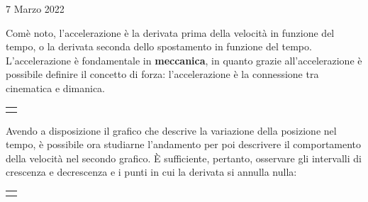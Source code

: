 \documentclass[a4paper]{extarticle}
\begin{document}
\newpage
\noindent
\begin{center}
  7 Marzo 2022
\end{center}
Comè noto, l'accelerazione è la derivata prima della velocità in funzione del tempo, o la derivata seconda dello spostamento in funzione del tempo.\\
L'accelerazione è fondamentale in \textbf{meccanica}, in quanto grazie all'accelerazione è possibile definire il concetto di forza: l'accelerazione è la connessione tra cinematica e dimanica.

\vspace{2em}
\noindent
{}
\begin{tabularx}{\textwidth}{P}
  {
      \centering
  }
\end{tabularx}

\vspace{1em}
\noindent
Avendo a disposizione il grafico che descrive la variazione della posizione nel tempo, è possibile ora studiarne l'andamento per poi descrivere il comportamento della velocità nel secondo grafico. È sufficiente, pertanto, osservare gli intervalli di crescenza e decrescenza e i punti in cui la derivata si annulla nulla:

\vspace{2em}
\noindent
{}
\begin{tabularx}{\textwidth}{P}
  {
      \centering
  }
\end{tabularx}
\end{document}
